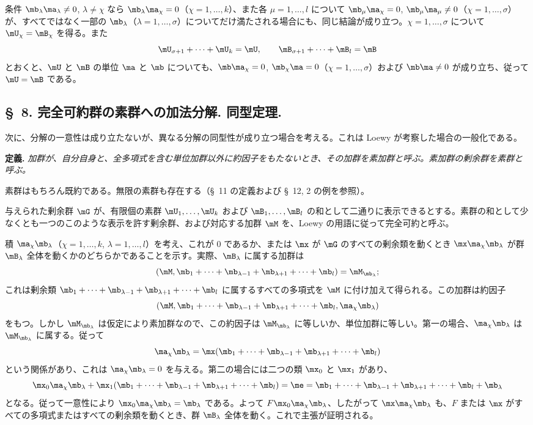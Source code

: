 \documentclass[11pt]{article}
\begin{document}
条件 $\mb_\lambda\ma_\lambda\ne0$, $\lambda\ne\chi$ なら $\mb_\lambda\ma_\chi=0$（$\chi=1,
\ldots,k$）、また各 $\mu=1,
\ldots,l$ について $\mb_\mu\ma_\chi=0$, $\mb_\mu\ma_\mu\ne0$（$\chi=1,
\ldots,\sigma$）が、すべてではなく一部の $\mb_\lambda$（$\lambda=1,
\ldots,\sigma$）についてだけ満たされる場合にも、同じ結論が成り立つ。$\chi=1,
\ldots,\sigma$ について $\mU_\chi=\mB_\chi$ を得る。また
\[
 \mU_{\sigma+1}+\cdots+\mU_k=\mU,
 \qquad
 \mB_{\sigma+1}+\cdots+\mB_l=\mB
\]
とおくと、$\mU$ と $\mB$ の単位 $\ma$ と $\mb$ についても、$\mb\ma_\chi=0$, $\mb_\chi\ma=0$（$\chi=1,
\ldots,\sigma$）および $\mb\ma\ne0$ が成り立ち、従って $\mU=\mB$ である。

\subsection*{\S~8. 完全可約群の素群への加法分解. 同型定理.}

次に、分解の一意性は成り立たないが、異なる分解の同型性が成り立つ場合を考える。これは Loewy が考察した場合の一般化である。

\textbf{定義.} \emph{加群が、自分自身と、全多項式を含む単位加群以外に約因子をもたないとき、その加群を素加群と呼ぶ。素加群の剰余群を素群と呼ぶ。}

素群はもちろん既約である。無限の素群も存在する（\S~11 の定義および \S~12, 2 の例を参照）。

与えられた剰余群 $\mG$ が、有限個の素群 $\mU_1,
\ldots,\mU_k$ および $\mB_1,
\ldots,\mB_l$ の和として二通りに表示できるとする。素群の和として少なくとも一つのこのような表示を許す剰余群、および対応する加群 $\mM$ を、Loewy の用語に従って完全可約と呼ぶ。

積 $\ma_\chi\mb_\lambda$（$\chi=1,
\ldots,k$, $\lambda=1,
\ldots,l$）を考え、これが $0$ であるか、または $\mx$ が $\mG$ のすべての剰余類を動くとき $\mx\ma_\chi\mb_\lambda$ が群 $\mB_\lambda$ 全体を動くかのどちらかであることを示す。実際、$\mB_\lambda$ に属する加群は
\[
 (\mM,\mb_1+\cdots+\mb_{\lambda-1}+\mb_{\lambda+1}+\cdots+\mb_l)=\mM_{\mb_\lambda};
\]
これは剰余類 $\mb_1+
\cdots+\mb_{\lambda-1}+\mb_{\lambda+1}+\cdots+\mb_l$ に属するすべての多項式を $\mM$ に付け加えて得られる。この加群は約因子
\[
 (\mM,\mb_1+\cdots+\mb_{\lambda-1}+\mb_{\lambda+1}+\cdots+\mb_l,
 \ma_\chi\mb_\lambda)
\]
をもつ。しかし $\mM_{\mb_\lambda}$ は仮定により素加群なので、この約因子は $\mM_{\mb_\lambda}$ に等しいか、単位加群に等しい。第一の場合、$\ma_\chi\mb_\lambda$ は $\mM_{\mb_\lambda}$ に属する。従って
\[
 \ma_\chi\mb_\lambda=\mx(\mb_1+
\cdots+\mb_{\lambda-1}+\mb_{\lambda+1}+\cdots+\mb_l)
\]
という関係があり、これは $\ma_\chi\mb_\lambda=0$ を与える。第二の場合には二つの類 $\mx_0$ と $\mx_1$ があり、
\[
 \mx_0\ma_\chi\mb_\lambda
 +\mx_1(\mb_1+\cdots+\mb_{\lambda-1}+\mb_{\lambda+1}+\cdots+\mb_l)
 =\me=\mb_1+\cdots+\mb_{\lambda-1}+\mb_{\lambda+1}+\cdots+\mb_l+\mb_\lambda
\]
となる。従って一意性により $\mx_0\ma_\chi\mb_\lambda=\mb_\lambda$ である。よって $F\mx_0\ma_\chi\mb_\lambda$、したがって $\mx\ma_\chi\mb_\lambda$ も、$F$ または $\mx$ がすべての多項式またはすべての剰余類を動くとき、群 $\mB_\lambda$ 全体を動く。これで主張が証明される。
\end{document}
